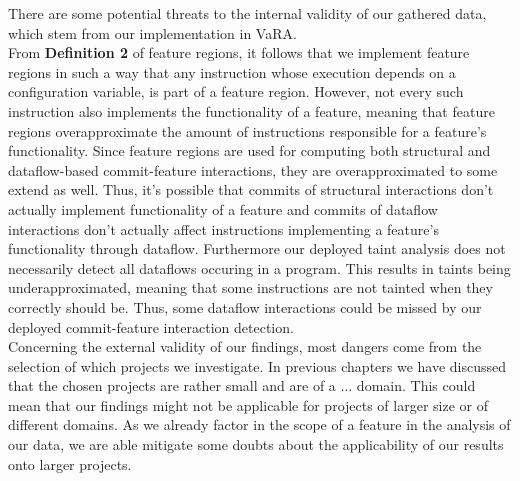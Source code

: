 There are some potential threats to the internal validity of our gathered data, which stem from our implementation in VaRA. \\
From \textbf{Definition 2} of feature regions, it follows that we implement feature regions in such a way that any instruction whose execution depends on a configuration variable, is part of a feature region.
However, not every such instruction also implements the functionality of a feature, meaning that feature regions overapproximate the amount of instructions responsible for a feature's functionality.
Since feature regions are used for computing both structural and dataflow-based commit-feature interactions, they are overapproximated to some extend as well.
Thus, it's possible that commits of structural interactions don't actually implement functionality of a feature and commits of dataflow interactions don't actually affect instructions implementing a feature's functionality through dataflow.
Furthermore our deployed taint analysis does not necessarily detect all dataflows occuring in a program.
This results in taints being underapproximated, meaning that some instructions are not tainted when they correctly should be.
Thus, some dataflow interactions could be missed by our deployed commit-feature interaction detection. \\
Concerning the external validity of our findings, most dangers come from the selection of which projects we investigate.
In previous chapters we have discussed that the chosen projects are rather small and are of a ... domain.
This could mean that our findings might not be applicable for projects of larger size or of different domains.
As we already factor in the scope of a feature in the analysis of our data, we are able mitigate some doubts about the applicability of our results onto larger projects.



